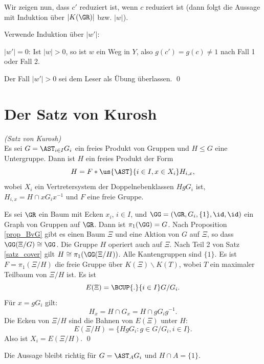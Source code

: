 \begin{enumerate}
Wir zeigen nun, dass $c'$ reduziert ist, wenn $c$ reduziert ist
(dann folgt die Aussage mit Induktion über $|K(\GR)|$ bzw. $|w|$).

Verwende Induktion über $|w'|$:

$|w'|=0$: Ist $|w|>0$, so ist $w$ ein Weg in $Y$, also
$g(c')=g(c)\neq 1$ nach Fall 1 oder Fall 2.

Der Fall $|w'|>0$ sei dem Leser als Übung überlassen.
\qed
\end{enumerate}

\section{Der Satz von Kurosh}\label{sec_kurosh}

\SATZ \emph{(Satz von Kurosh)}\\
Es sei $G=\AST_{i\in I} G_i$ ein freies Produkt von Gruppen und
$H\leq G$ eine Untergruppe. Dann ist $H$ ein freies Produkt der
Form
\[
H = F * \us{\AST}{i\in I, x\in X_i} H_{i,x},
\]
wobei $X_i$ ein Vertretersystem der Doppelnebenklassen $H g G_i$ ist,
$H_{i,x} = H \cap x G_i x^{-1}$ und $F$ eine freie Gruppe.

\bew Es sei $\GR$ ein Baum mit Ecken $x_i$, $i\in I$, und
$\GG=(\GR,G_i,\{1\},\id,\id)$ ein Graph von Gruppen auf $\GR$.
Dann ist $\pi_1(\GG)=G$.
Nach Proposition \ref{prop_BvG} gibt es einen Baum $\Xi$ und
eine Aktion von $G$ auf $\Xi$, so dass $\GG(\Xi/G)\cong \GG$.
Die Gruppe $H$ operiert auch auf $\Xi$. Nach Teil 2 von
Satz \ref{satz_cover} gilt $H\cong \pi_1(\GG(\Xi/H))$.
Alle Kantengruppen sind $\{1\}$.
Es ist $F=\pi_1(\Xi/H)$ die freie Gruppe über $K(\Xi)\backslash K(T)$,
wobei $T$ ein maximaler Teilbaum von $\Xi/H$ ist.
Es ist
\[
E(\Xi)=\BCUP{.}{i\in I} G/G_i.
\]
Für $x=g G_i$ gilt:
\[
H_x = H \cap G_x = H \cap g G_i g^{-1}.
\]
Die Ecken von $\Xi/H$ sind die Bahnen von $E(\Xi)$ unter $H$:
\[
E(\Xi/H) = \{ H g G_i : g \in G/G_i, i\in I \}.
\]
Also ist $X_i=E(\Xi/H)$.
\qed

Die Aussage bleibt richtig für $G=\AST_A G_i$ und $H\cap A =\{1\}$.
